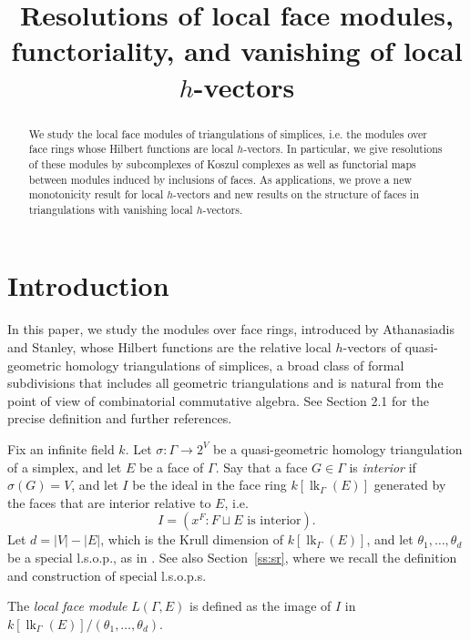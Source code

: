 \documentclass[ALCO, Unicode,published]{cedram}
\title[Resolutions of local face modules]{Resolutions of local face modules, functoriality, and vanishing of local $h$-vectors}
\author[\initial{M.} Larson]{\firstname{Matt} \lastname{Larson}}
\author[\initial{S.} Payne]{\firstname{Sam} \lastname{Payne}}
\author[\initial{A.} Stapledon]{\firstname{Alan} \lastname{Stapledon}}
\DeclareMathOperator{\lk}{lk}
\begin{document}

\begin{abstract}
We study the local face modules of triangulations of simplices, i.e. the modules over face rings whose Hilbert functions are local $h$-vectors. In particular, we give resolutions of these modules by subcomplexes of Koszul complexes as well as  functorial maps between modules induced by inclusions of faces.  As applications, we prove a new monotonicity result for local $h$-vectors and new results on the structure of faces in triangulations with vanishing local $h$-vectors.
\end{abstract}


\maketitle



\section{Introduction}

In this paper, we study the modules over face rings, introduced by Athanasiadis and Stanley, whose Hilbert functions are the relative local $h$-vectors of quasi-geometric homology triangulations of simplices, a broad class of formal subdivisions that includes all geometric triangulations and is natural from the point of view of combinatorial commutative algebra.  See Section 2.1 for the precise definition and further references.

Fix an infinite field $k$.  Let $\sigma \colon \Gamma \to 2^V$ be a quasi-geometric homology triangulation of a simplex, and let $E$ be a face of $\Gamma$. Say that a face $G \in \Gamma$ is \emph{interior} if $\sigma(G) = V$, and let $I$ be the ideal in the face ring $k[\lk_\Gamma(E)]$ generated by the faces that are interior relative to $E$, i.e. 
\[
 I = (x^F : F \sqcup E \mbox{ is interior} ).
\]
Let $d = |V|-|E|$, which is the Krull dimension of $k[\lk_\Gamma(E)]$, and let $\theta_1, \ldots, \theta_{d}$ be a special l.s.o.p., as in \cite{Stanley92, Athanasiadis12b}. See also Section~\ref{ss:sr}, where we recall the definition and construction of special l.s.o.p.s.

\begin{definition}
The \emph{local face module} $L(\Gamma,E)$ is defined as the image of $I$ in $k[\lk_\Gamma(E)]/(\theta_1, \ldots, \theta_d)$.
\end{definition}
\end{document}
